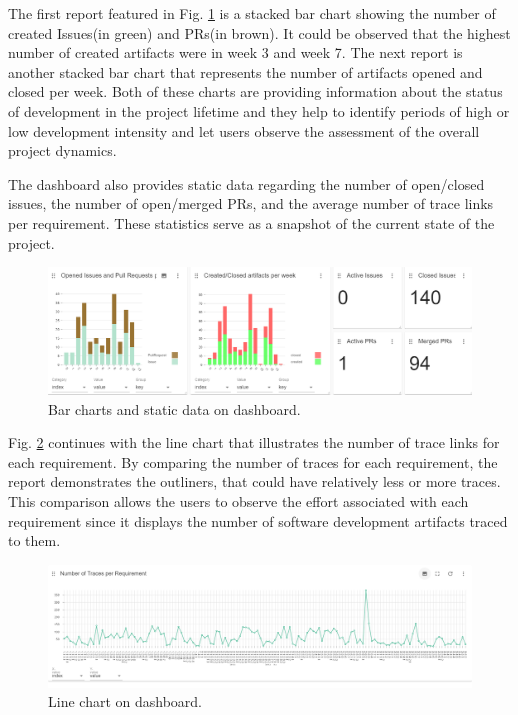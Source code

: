 The first report featured in Fig. \ref{fig:barcharts} is a stacked bar chart showing the number of created Issues(in green) and PRs(in brown). It could be observed that the highest number of created artifacts were in week 3 and week 7. The next report is another stacked bar chart that represents the number of artifacts opened and closed per week. Both of these charts are providing information about the status of development in the project lifetime and they help to identify periods of high or low development intensity and let users observe the assessment of the overall project dynamics.

The dashboard also provides static data regarding the number of open/closed issues, the number of open/merged PRs, and the average number of trace links per requirement. These statistics serve as a snapshot of the current state of the project.

\begin{figure}[htb]
    \centering
    \includegraphics[width=1\linewidth]{figs/dashboard-barcharts.png}
    \caption{Bar charts and static data on dashboard.}
    \label{fig:barcharts}
\end{figure}

Fig. \ref{fig:linechart} continues with the line chart that illustrates the number of trace links for each requirement. By comparing the number of traces for each requirement, the report demonstrates the outliners, that could have relatively less or more traces. This comparison allows the users to observe the effort associated with each requirement since it displays the number of software development artifacts traced to them.

\begin{figure}[htb]
    \centering
    \includegraphics[width=1\linewidth]{figs/linechart.png}
    \caption{Line chart on dashboard.}
    \label{fig:linechart}
\end{figure}

